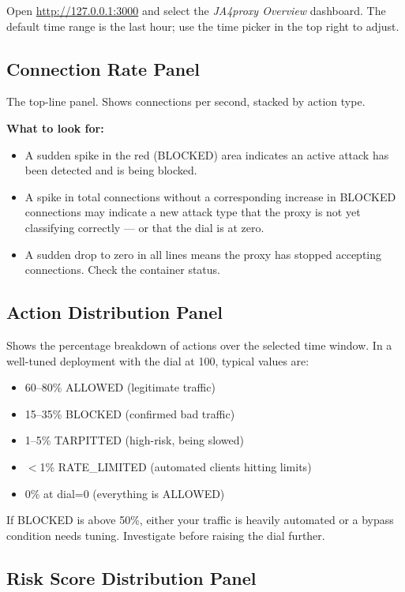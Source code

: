 Open \url{http://127.0.0.1:3000} and select the \emph{JA4proxy Overview} dashboard.
The default time range is the last hour; use the time picker in the top right to
adjust.

\subsection{Connection Rate Panel}

The top-line panel. Shows connections per second, stacked by action type.

\textbf{What to look for:}
\begin{itemize}
  \item A sudden spike in the red (BLOCKED) area indicates an active attack
    has been detected and is being blocked.
  \item A spike in total connections without a corresponding increase in BLOCKED
    connections may indicate a new attack type that the proxy is not yet classifying
    correctly — or that the dial is at zero.
  \item A sudden drop to zero in all lines means the proxy has stopped accepting
    connections. Check the container status.
\end{itemize}

\subsection{Action Distribution Panel}

Shows the percentage breakdown of actions over the selected time window.
In a well-tuned deployment with the dial at 100, typical values are:

\begin{itemize}
  \item 60--80\% ALLOWED (legitimate traffic)
  \item 15--35\% BLOCKED (confirmed bad traffic)
  \item 1--5\% TARPITTED (high-risk, being slowed)
  \item $<$1\% RATE\_LIMITED (automated clients hitting limits)
  \item 0\% at dial=0 (everything is ALLOWED)
\end{itemize}

If BLOCKED is above 50\%, either your traffic is heavily automated or a bypass
condition needs tuning. Investigate before raising the dial further.

\subsection{Risk Score Distribution Panel}

